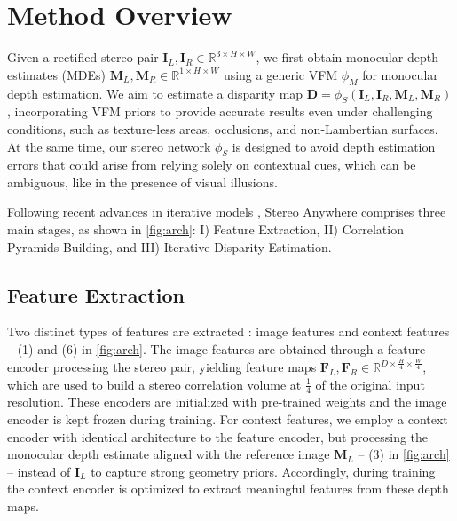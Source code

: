 \documentclass[10pt,twocolumn,letterpaper]{article}
\newcommand{\method}[0]{Stereo Anywhere\xspace}
\begin{document}
\phantom{Invisible Text}
\vspace{-\baselineskip}

\section{Method Overview}

\label{sec:method}

Given a rectified stereo pair $\mathbf{I}_L, \mathbf{I}_R \in \mathbb{R}^{3 \times H \times W}$, we first obtain monocular depth estimates (MDEs) $\mathbf{M}_L, \mathbf{M}_R \in \mathbb{R}^{1 \times H \times W}$ using a generic VFM $\phi_M$ for monocular depth estimation. We aim to estimate a disparity map $\mathbf{D}=\phi_S(\mathbf{I}_L, \mathbf{I}_R, \mathbf{M}_L, \mathbf{M}_R)$, incorporating VFM priors to provide accurate results even under challenging conditions, such as texture-less areas, occlusions, and non-Lambertian surfaces.
At the same time, our stereo network $\phi_S$ is designed to avoid depth estimation errors that could arise from relying solely on contextual cues, which can be ambiguous, like in the presence of visual illusions.

Following recent advances in iterative models \cite{lipson2021raft}, \method comprises three main stages, as shown in \cref{fig:arch}: I) Feature Extraction, II) Correlation Pyramids Building, and III) Iterative Disparity Estimation.


\phantom{Invisible Text}
\vspace{-\baselineskip}

\subsection{Feature Extraction}


Two distinct types of features are extracted \cite{lipson2021raft}: image features and context features -- (1) and (6) in \cref{fig:arch}.
The image features are obtained through a feature encoder processing the stereo pair, yielding feature maps $\mathbf{F}_L, \mathbf{F}_R \in \mathbb{R}^{D \times \frac{H}{4} \times \frac{W}{4}}$, which are used to build a stereo correlation volume at $\frac{1}{4}$ of the original input resolution.
These encoders are initialized with pre-trained weights \cite{lipson2021raft} and the image encoder is kept frozen during training.
For context features, we employ a context encoder with identical architecture to the feature encoder, but processing the monocular depth estimate aligned with the reference image $\mathbf{M}_L$ -- (3) in \cref{fig:arch} -- instead of $\mathbf{I}_L$ to capture strong geometry priors. Accordingly, during training the context encoder is optimized to extract meaningful features from these depth maps.
\end{document}
